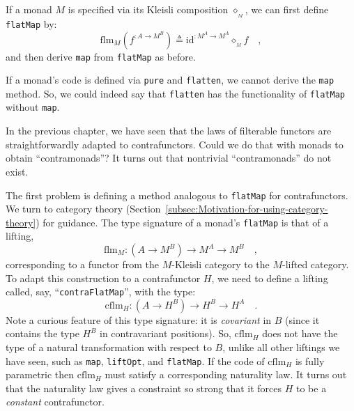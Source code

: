If a monad $M$ is specified via its Kleisli composition $\diamond_{_{M}}$,
we can first define \lstinline!flatMap! by:
\[
\text{flm}_{M}(f^{:A\rightarrow M^{B}})\triangleq\text{id}^{:M^{A}\rightarrow M^{A}}\diamond_{_{M}}f\quad,
\]
and then derive \lstinline!map! from \lstinline!flatMap! as before.

If a monad\textsf{'}s code is defined via \lstinline!pure! and \lstinline!flatten!,
we cannot derive the \lstinline!map! method. So, we could indeed
say that \lstinline!flatten! has the functionality of \lstinline!flatMap!
without \lstinline!map!.

In the previous chapter, we have seen that the laws of filterable
functors are straightforwardly adapted to contrafunctors. Could we
do that with monads to obtain \textsf{``}contramonads\textsf{''}? It turns out that
nontrivial \textsf{``}contramonads\textsf{''} do not exist. 

The first problem is defining a method analogous to \lstinline!flatMap!
for contrafunctors. We turn to category theory (Section~\ref{subsec:Motivation-for-using-category-theory})
for guidance. The type signature of a monad\textsf{'}s \lstinline!flatMap!
is that of a lifting,
\[
\text{flm}_{M}:(A\rightarrow M^{B})\rightarrow M^{A}\rightarrow M^{B}\quad,
\]
corresponding to a functor from the $M$-Kleisli category to the $M$-lifted
category. To adapt this construction to a contrafunctor $H$, we need
to define a lifting called, say, \textsf{``}\lstinline!contraFlatMap!\textsf{''},
with the type:
\[
\text{cflm}_{H}:(A\rightarrow H^{B})\rightarrow H^{B}\rightarrow H^{A}\quad.
\]
Note a curious feature of this type signature: it is \emph{covariant}
in $B$ (since it contains the type $H^{B}$ in contravariant positions).
So, $\text{cflm}_{H}$ does not have the type of a natural transformation
with respect to $B$, unlike all other liftings we have seen, such
as \lstinline!map!, \lstinline!liftOpt!, and \lstinline!flatMap!.
If the code of $\text{cflm}_{H}$ is fully parametric then $\text{cflm}_{H}$
must satisfy a corresponding naturality law. It turns out that the
naturality law gives a constraint so strong that it forces $H$ to
be a \emph{constant} contrafunctor.

